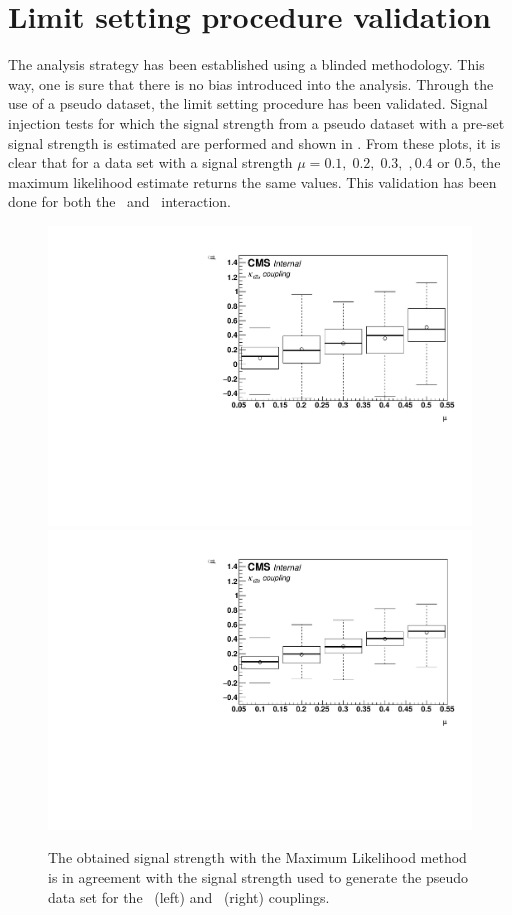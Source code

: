 \section{Limit setting procedure validation}
\label{sec:val}
The analysis strategy has been established using a blinded methodology. This way, one is sure that there is no bias introduced into the analysis. Through the use of a pseudo dataset, the limit setting procedure has been validated. Signal injection tests for which the signal strength from a pseudo dataset with a pre-set  signal strength is estimated are performed and shown in . From these plots, it is clear that for a data set with a signal strength $\mu= 0.1,\;0.2,\;0.3,\;,0.4$ or $0.5$, the maximum likelihood estimate returns the same values. This validation has been done for both the \Zut\ and \Zct\ interaction.
\begin{figure}[htbp]
	\centering
	 \includegraphics[width=0.49\linewidth]{6_Search/Figures/SignalInjection/plotZuttrial}
	 \includegraphics[width=0.49\linewidth]{6_Search/Figures/SignalInjection/plotZcttrial}
	\caption{The  obtained signal strength with the Maximum Likelihood method is in agreement with the signal strength used to generate the pseudo data set for the \Zut\ (left) and \Zct\ (right) couplings.}
	\label{fig:plotzut}
\end{figure}

